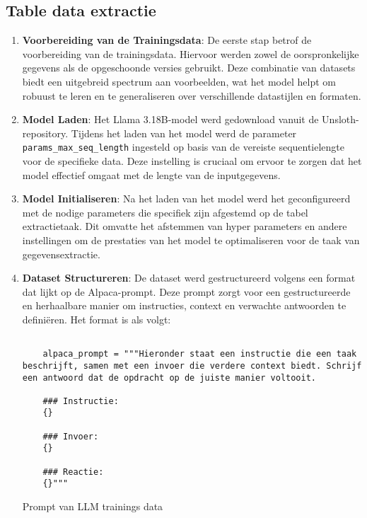 \subsection{Table data extractie}
\begin{enumerate}
\item \textbf{Voorbereiding van de Trainingsdata}:
    De eerste stap betrof de voorbereiding van de trainingsdata. Hiervoor werden zowel de oorspronkelijke gegevens als de opgeschoonde versies gebruikt. Deze combinatie van datasets biedt een uitgebreid spectrum aan voorbeelden, wat het model helpt om robuust te leren en te generaliseren over verschillende datastijlen en formaten.
\item \textbf{Model Laden}:
Het Llama 3.18B-model werd gedownload vanuit de Unsloth-repository. Tijdens het laden van het model werd de parameter \texttt{params\_max\_seq\_length} ingesteld op basis van de vereiste sequentielengte voor de specifieke data. Deze instelling is cruciaal om ervoor te zorgen dat het model effectief omgaat met de lengte van de inputgegevens.

\item \textbf{Model Initialiseren}:
Na het laden van het model werd het geconfigureerd met de nodige parameters die specifiek zijn afgestemd op de tabel extractietaak. Dit omvatte het afstemmen van hyper parameters en andere instellingen om de prestaties van het model te optimaliseren voor de taak van gegevensextractie.

\item \textbf{Dataset Structureren}:
De dataset werd gestructureerd volgens een format dat lijkt op de Alpaca-prompt. Deze prompt zorgt voor een gestructureerde en herhaalbare manier om instructies, context en verwachte antwoorden te definiëren. Het format is als volgt:

\begin{listing}
    \begin{verbatim}

    alpaca_prompt = """Hieronder staat een instructie die een taak beschrijft, samen met een invoer die verdere context biedt. Schrijf een antwoord dat de opdracht op de juiste manier voltooit.
    
    ### Instructie:
    {}
    
    ### Invoer:
    {}
    
    ### Reactie:
    {}"""
        \end{verbatim}
        \caption{Prompt van LLM trainings data}
\end{listing}


\end{enumerate}
